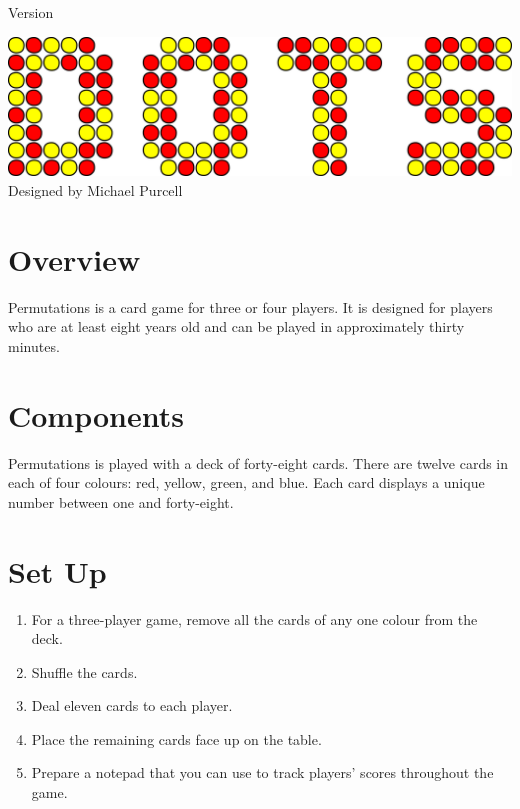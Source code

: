 \documentclass[a6paper, parskip=half, DIV=14, 10pt]{scrartcl}
\begin{document}
{%
\thispagestyle{empty}
		\enlargethispage{3.5\baselineskip} %
\setmainfont[Scale=1.0]{Tex Gyre Schola}
\begin{center}
\makeatletter
{Version \@version}
\makeatother

\vfill
\includegraphics[width=\textwidth]{dots_logo.png}
\vfill{}
\Large
\setmainfont{Tex Gyre Schola}
Designed by Michael Purcell
\end{center}
}%

\newpage
\setmainfont{Tex Gyre Schola}%
\raggedright%
\section*{Overview}
Permutations is a card game for three or four players.
It is designed for players who are at least eight years old and can be played in
approximately thirty minutes.

\vfill

\section*{Components}
Permutations is played with a deck of forty-eight cards.
There are twelve cards in each of four colours: red, yellow, green, and blue.
Each card displays a unique number between one and forty-eight.

\vfill

\section*{Set Up}
\begin{enumerate}[leftmargin=*]
	\item For a three-player game, remove all the cards of any one colour from the deck.
	\item Shuffle the cards.
	\item Deal eleven cards to each player.
	\item Place the remaining cards face up on the table.
	\item Prepare a notepad that you can use to track players' scores throughout the game.
\end{enumerate}
\end{document}
